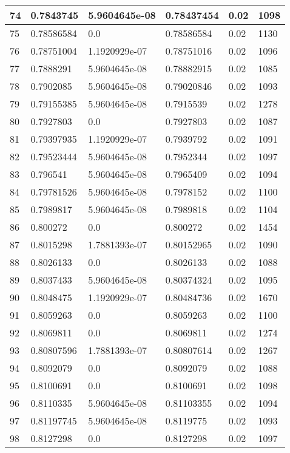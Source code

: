 \begin{longtable}{|l|l|l|l|l|l|}
74 & 0.7843745 & 5.9604645e-08 & 0.78437454 & 0.02 & 1098 \\ \hline 
75 & 0.78586584 & 0.0 & 0.78586584 & 0.02 & 1130 \\ \hline 
76 & 0.78751004 & 1.1920929e-07 & 0.78751016 & 0.02 & 1096 \\ \hline 
77 & 0.7888291 & 5.9604645e-08 & 0.78882915 & 0.02 & 1085 \\ \hline 
78 & 0.7902085 & 5.9604645e-08 & 0.79020846 & 0.02 & 1093 \\ \hline 
79 & 0.79155385 & 5.9604645e-08 & 0.7915539 & 0.02 & 1278 \\ \hline 
80 & 0.7927803 & 0.0 & 0.7927803 & 0.02 & 1087 \\ \hline 
81 & 0.79397935 & 1.1920929e-07 & 0.7939792 & 0.02 & 1091 \\ \hline 
82 & 0.79523444 & 5.9604645e-08 & 0.7952344 & 0.02 & 1097 \\ \hline 
83 & 0.796541 & 5.9604645e-08 & 0.7965409 & 0.02 & 1094 \\ \hline 
84 & 0.79781526 & 5.9604645e-08 & 0.7978152 & 0.02 & 1100 \\ \hline 
85 & 0.7989817 & 5.9604645e-08 & 0.7989818 & 0.02 & 1104 \\ \hline 
86 & 0.800272 & 0.0 & 0.800272 & 0.02 & 1454 \\ \hline 
87 & 0.8015298 & 1.7881393e-07 & 0.80152965 & 0.02 & 1090 \\ \hline 
88 & 0.8026133 & 0.0 & 0.8026133 & 0.02 & 1088 \\ \hline 
89 & 0.8037433 & 5.9604645e-08 & 0.80374324 & 0.02 & 1095 \\ \hline 
90 & 0.8048475 & 1.1920929e-07 & 0.80484736 & 0.02 & 1670 \\ \hline 
91 & 0.8059263 & 0.0 & 0.8059263 & 0.02 & 1100 \\ \hline 
92 & 0.8069811 & 0.0 & 0.8069811 & 0.02 & 1274 \\ \hline 
93 & 0.80807596 & 1.7881393e-07 & 0.80807614 & 0.02 & 1267 \\ \hline 
94 & 0.8092079 & 0.0 & 0.8092079 & 0.02 & 1088 \\ \hline 
95 & 0.8100691 & 0.0 & 0.8100691 & 0.02 & 1098 \\ \hline 
96 & 0.8110335 & 5.9604645e-08 & 0.81103355 & 0.02 & 1094 \\ \hline 
97 & 0.81197745 & 5.9604645e-08 & 0.8119775 & 0.02 & 1093 \\ \hline 
98 & 0.8127298 & 0.0 & 0.8127298 & 0.02 & 1097 \\ \hline 

\end{longtable}
